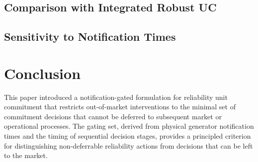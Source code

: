 \documentclass[journal]{IEEEtran}
\begin{document}
\subsection{Comparison with Integrated Robust UC}
\label{sec:results_aruc}


\subsection{Sensitivity to Notification Times}
\label{sec:results_sensitivity}



\section{Conclusion}\label{sec:conclusion}

This paper introduced a notification-gated formulation for
reliability unit commitment that restricts out-of-market interventions
to the minimal set of commitment decisions that cannot be deferred to
subsequent market or operational processes.
The gating set, derived from physical generator notification times and
the timing of sequential decision stages, provides a principled
criterion for distinguishing non-deferrable reliability actions from
decisions that can be left to the market.
\end{document}
